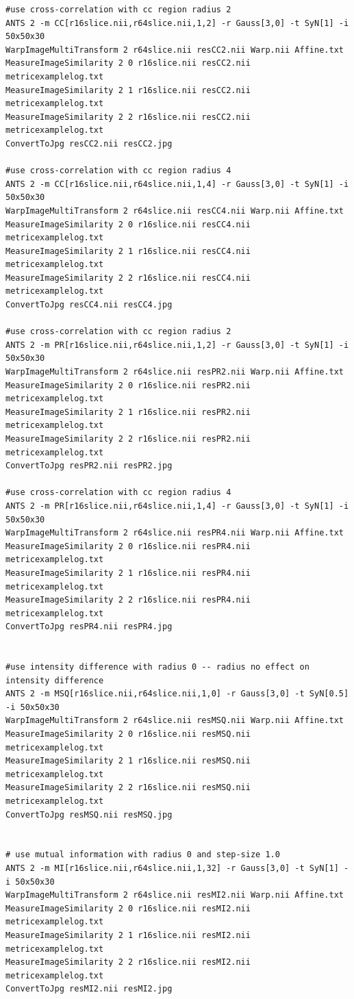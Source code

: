 \begin{verbatim}
#use cross-correlation with cc region radius 2
ANTS 2 -m CC[r16slice.nii,r64slice.nii,1,2] -r Gauss[3,0] -t SyN[1] -i 50x50x30
WarpImageMultiTransform 2 r64slice.nii resCC2.nii Warp.nii Affine.txt
MeasureImageSimilarity 2 0 r16slice.nii resCC2.nii metricexamplelog.txt
MeasureImageSimilarity 2 1 r16slice.nii resCC2.nii metricexamplelog.txt
MeasureImageSimilarity 2 2 r16slice.nii resCC2.nii metricexamplelog.txt
ConvertToJpg resCC2.nii resCC2.jpg

#use cross-correlation with cc region radius 4
ANTS 2 -m CC[r16slice.nii,r64slice.nii,1,4] -r Gauss[3,0] -t SyN[1] -i 50x50x30
WarpImageMultiTransform 2 r64slice.nii resCC4.nii Warp.nii Affine.txt
MeasureImageSimilarity 2 0 r16slice.nii resCC4.nii metricexamplelog.txt
MeasureImageSimilarity 2 1 r16slice.nii resCC4.nii metricexamplelog.txt
MeasureImageSimilarity 2 2 r16slice.nii resCC4.nii metricexamplelog.txt
ConvertToJpg resCC4.nii resCC4.jpg

#use cross-correlation with cc region radius 2
ANTS 2 -m PR[r16slice.nii,r64slice.nii,1,2] -r Gauss[3,0] -t SyN[1] -i 50x50x30
WarpImageMultiTransform 2 r64slice.nii resPR2.nii Warp.nii Affine.txt
MeasureImageSimilarity 2 0 r16slice.nii resPR2.nii metricexamplelog.txt
MeasureImageSimilarity 2 1 r16slice.nii resPR2.nii metricexamplelog.txt
MeasureImageSimilarity 2 2 r16slice.nii resPR2.nii metricexamplelog.txt
ConvertToJpg resPR2.nii resPR2.jpg

#use cross-correlation with cc region radius 4
ANTS 2 -m PR[r16slice.nii,r64slice.nii,1,4] -r Gauss[3,0] -t SyN[1] -i 50x50x30
WarpImageMultiTransform 2 r64slice.nii resPR4.nii Warp.nii Affine.txt
MeasureImageSimilarity 2 0 r16slice.nii resPR4.nii metricexamplelog.txt
MeasureImageSimilarity 2 1 r16slice.nii resPR4.nii metricexamplelog.txt
MeasureImageSimilarity 2 2 r16slice.nii resPR4.nii metricexamplelog.txt
ConvertToJpg resPR4.nii resPR4.jpg


#use intensity difference with radius 0 -- radius no effect on intensity difference
ANTS 2 -m MSQ[r16slice.nii,r64slice.nii,1,0] -r Gauss[3,0] -t SyN[0.5] -i 50x50x30
WarpImageMultiTransform 2 r64slice.nii resMSQ.nii Warp.nii Affine.txt
MeasureImageSimilarity 2 0 r16slice.nii resMSQ.nii metricexamplelog.txt
MeasureImageSimilarity 2 1 r16slice.nii resMSQ.nii metricexamplelog.txt
MeasureImageSimilarity 2 2 r16slice.nii resMSQ.nii metricexamplelog.txt
ConvertToJpg resMSQ.nii resMSQ.jpg


# use mutual information with radius 0 and step-size 1.0
ANTS 2 -m MI[r16slice.nii,r64slice.nii,1,32] -r Gauss[3,0] -t SyN[1] -i 50x50x30
WarpImageMultiTransform 2 r64slice.nii resMI2.nii Warp.nii Affine.txt
MeasureImageSimilarity 2 0 r16slice.nii resMI2.nii metricexamplelog.txt
MeasureImageSimilarity 2 1 r16slice.nii resMI2.nii metricexamplelog.txt
MeasureImageSimilarity 2 2 r16slice.nii resMI2.nii metricexamplelog.txt
ConvertToJpg resMI2.nii resMI2.jpg

\end{verbatim}
